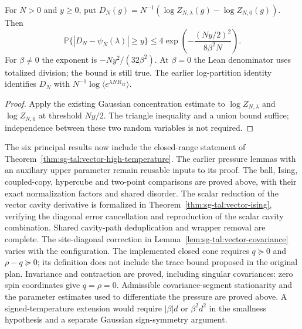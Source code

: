 \begin{theorem}\label{thm:sg-tal:vector-coupled-ratio-concentration}
\leanok
For $N>0$ and $y\ge0$, put
$D_N(g)=N^{-1}(\log Z_{N,\lambda}(g)-\log Z_{N,0}(g))$. Then
\[
 \mathbb P\{|D_N-\psi_N(\lambda)|\ge y\}
 \le 4\exp\left(-\frac{(Ny/2)^2}{8\beta^2N}\right).
\]
For $\beta\ne0$ the exponent is $-Ny^2/(32\beta^2)$. At $\beta=0$ the Lean denominator
uses totalized division; the bound is still true. The earlier log-partition identity
identifies $D_N$ with $N^{-1}\log\langle e^{\lambda NR_{12}}\rangle$.
\end{theorem}
\begin{proof}
Apply the existing Gaussian concentration estimate to $\log Z_{N,\lambda}$ and
$\log Z_{N,0}$ at threshold $Ny/2$. The triangle inequality and a union bound suffice;
independence between these two random variables is not required.
\end{proof}

\begin{remark}\label{rem:sg-tal:vector-remaining}
The six principal results now include the closed-range statement of
Theorem~\ref{thm:sg-tal:vector-high-temperature}. The earlier pressure lemmas
with an auxiliary upper parameter remain reusable inputs to its proof.
The ball, Ising, coupled-copy, hypercube and two-point comparisons are proved above,
with their exact normalization factors and shared disorder. The scalar reduction of
the vector cavity derivative is formalized in Theorem~\ref{thm:sg-tal:vector-ising},
verifying the diagonal error cancellation and reproduction of the scalar cavity combination.
Shared cavity-path deduplication and wrapper removal are complete.
The site-diagonal correction in Lemma~\ref{lem:sg-tal:vector-covariance} varies with the
configuration. The implemented closed cone requires $q\succeq0$ and $\rho-q\succeq0$;
its definition does not include the trace bound proposed in the original plan.
Invariance and contraction are proved, including singular covariances:
zero spin coordinates give $q=\rho=0$. Admissible covariance-segment stationarity and the
parameter estimates used to differentiate the pressure are proved above.
A signed-temperature extension would require $|\beta|d$ or $\beta^2d^2$ in the
smallness hypothesis and a separate Gaussian sign-symmetry argument.
\end{remark}

